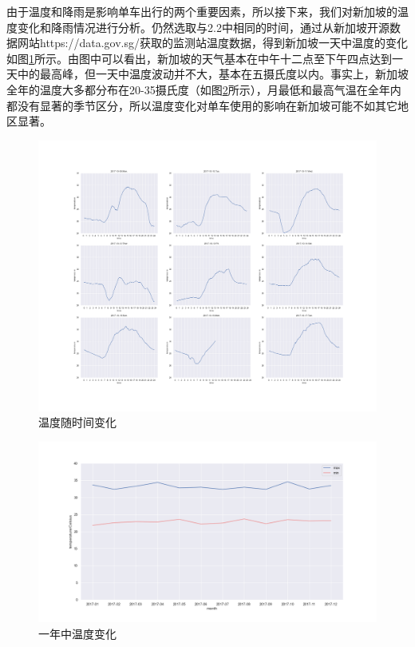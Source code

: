 \documentclass[]{tongjithesis}
\numberwithin{equation}{chapter}
\begin{document}
由于温度和降雨是影响单车出行的两个重要因素，所以接下来，我们对新加坡的温度变化和降雨情况进行分析。仍然选取与2.2中相同的时间，通过从新加坡开源数据网站https://data.gov.sg/获取的监测站温度数据，得到新加坡一天中温度的变化如图\ref{tempre}所示。由图中可以看出，新加坡的天气基本在中午十二点至下午四点达到一天中的最高峰，但一天中温度波动并不大，基本在五摄氏度以内。事实上，新加坡全年的温度大多都分布在20-35摄氏度（如图\ref{tempre_overall}所示），月最低和最高气温在全年内都没有显著的季节区分，所以温度变化对单车使用的影响在新加坡可能不如其它地区显著。
\begin{figure}[H]
	\centering
	\includegraphics[width= 1.0 \textwidth]{figures_main/tempre.png}
	\caption{温度随时间变化}
	\label{tempre}
\end{figure}

\begin{figure}[H]
	\centering
	\includegraphics[width= 1.0 \textwidth]{figures_main/tempreture_overall.png}
	\caption{一年中温度变化}
	\label{tempre_overall}
\end{figure}
\end{document}
